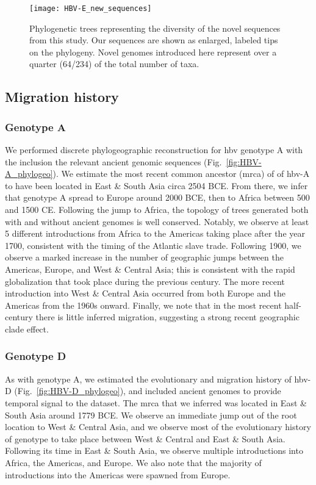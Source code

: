 \begin{figure}[ht]
  \centering
  \medskip
  \texttt{[image: HBV-E\_new\_sequences]}
  \caption[HBV-E New sequences]{Phylogenetic trees representing the diversity of the novel sequences from this study. Our sequences are shown as enlarged, labeled tips on the phylogeny. Novel genomes introduced here represent over a quarter (64/234) of the total number of taxa.}
  \label{fig:HBV-E_new_sequences}
\end{figure}

\subsection{Migration history}

\subsubsection{Genotype A}

We performed discrete phylogeographic reconstruction for \gls{hbv} genotype A with the inclusion the relevant ancient genomic sequences (Fig.~\ref{fig:HBV-A_phylogeo}).
We estimate the most recent common ancestor (\gls{mrca}) of of \gls{hbv}-A to have been located in East \& South Asia circa 2504 BCE.
From there, we infer that genotype A spread to Europe around 2000 BCE, then to Africa between 500 and 1500 CE.
Following the jump to Africa, the topology of trees generated both with and without ancient genomes is well conserved.
Notably, we observe at least 5 different introductions from Africa to the Americas taking place after the year 1700, consistent with the timing of the Atlantic slave trade.
Following 1900, we observe a marked increase in the number of geographic jumps between the Americas, Europe, and West \& Central Asia; this is consistent with the rapid globalization that took place during the previous century.
The more recent introduction into West \& Central Asia occurred from both Europe and the Americas from the 1960s onward.
Finally, we note that in the most recent half-century there is little inferred migration, suggesting a strong recent geographic clade effect.

\subsubsection{Genotype D}

As with genotype A, we estimated the evolutionary and migration history of \gls{hbv}-D (Fig.~\ref{fig:HBV-D_phylogeo}), and included ancient genomes to provide temporal signal to the dataset.
The \gls{mrca} that we inferred was located in East \& South Asia around 1779 BCE.
We observe an immediate jump out of the root location to West \& Central Asia, and we observe most of the evolutionary history of genotype to take place between West \& Central and East \& South Asia.
Following its time in East \& South Asia, we observe multiple introductions into Africa, the Americas, and Europe.
We also note that the majority of introductions into the Americas were spawned from Europe.

